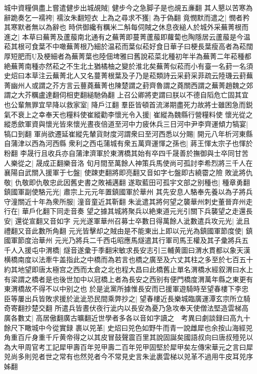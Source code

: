 城中資糧俱盡上嘗遣健步出城覘賊|{
	健步今之急脚子是也覘五亷翻}
其人懇以苦寒為辭跪奏乞一襦袴|{
	襦汝朱翻短衣}
上為之尋求不獲|{
	為于偽翻}
竟憫默而遣之|{
	憫者矜其寒默者無以為辭也}
時供御纔有糲米二斛每伺賊之休息夜縋人於城外采蕪菁根而進之|{
	本草曰蕪菁及蘆菔南北通有之蕪菁即蔓菁蘆菔即蘿蔔也陶隱居云蘆菔是今温菘其根可食葉不中噉蕪菁根乃細於温菘而葉似菘好食日華子曰梗長葉瘦高者為菘闊厚短肥而及梗細者為蕪菁葉也陸佃埤雅曰舊說菘菜北種初年半為蕪菁二年菘種都絶蕪菁南種亦然菘之不生北土猶橘柚之變於淮北矣蕪菁似菘而小有臺一名葑一名須史炤曰本草注云蕪菁北人又名蔓菁根葉及子乃是菘類詩云采葑采菲疏云陸璣云葑蕪菁幽州人或謂之芥方言云蘴蕘蕪菁也陳楚謂之葑齊魯謂之蕘關西謂之蕪菁趙魏之郊謂之大芥糲盧達翻伺相吏翻縋馳偽翻}
上召公卿將吏謂曰朕以不德自䧟危亡固其宜也公輩無罪宜早降以救家室|{
	降戶江翻}
羣臣皆頓首流涕期盡死力故將士雖困急而鋭氣不衰上之幸奉天也糧料使崔縱勸李懷光令入援|{
	崔縱為魏縣行營糧料使}
懷光從之縱悉歛軍資與懷光皆來懷光晝夜倍道至河中力疲休兵三日河中尹李齊運傾力犒宴|{
	犒口到翻}
軍尚欲遷延崔縱先輦貨財度河謂衆曰至河西悉以分賜|{
	開元八年析河東縣自蒲津以西為河西縣}
衆利之西屯蒲城有衆五萬齊運惲之孫也|{
	蔣王惲太宗子也惲於粉翻}
李晟行且收兵亦自蒲津濟軍於東渭橋其始有卒四千晟善於撫御與士卒同甘苦人樂從之|{
	晟成正翻樂音洛}
旬月間至萬餘人神策兵馬使尚可孤討李希烈將三千人在襄陽自武關入援軍于七盤|{
	使踈吏翻將即亮翻又音如字七盤即古繞霤之險}
敗泚將仇敬|{
	仇敬即仇敬忠此因舊史書之敗補邁翻}
遂取藍田可孤宇文部之别種也|{
	種章勇翻}
鎮國軍副使駱元光|{
	肅宗上元元年置鎮國軍於華州}
其先安息人駱奉先養以為子將兵守潼關近十年為衆所服|{
	潼音童近其靳翻}
朱泚遣其將何望之襲華州刺史董晉弃州走行在|{
	華戶化翻下同走音奏}
望之據其城將聚兵以絶東道元光引關下兵襲望之走還長安|{
	還從宣翻又音如字}
元光遂軍華州召募士卒數日得萬餘人泚數遣兵攻元光|{
	泚且禮翻又音此數所角翻}
元光皆擊却之賊由是不能東出上即以元光為鎮國軍節度使|{
	鎮國軍節度治華州}
元光乃將兵二千西屯昭應馬燧遣其行軍司馬王權及其子彚將兵五千人入援屯中渭橋|{
	燧音遂彚于季翻宋敏求長安志引三輔黄圖曰渭水貫都以象天漢横橋南度以法牽牛盖指此之中橋而為若言也橋之廣至及六丈其柱之多至於七百五十約其地望即唐太極宫之西而太倉之北也程大昌曰此橋舊止單名渭橋水經叙渭曰水上有梁謂之橋者是也後世加中以冠橋上者為長安之西别有便門橋度渭萬年縣之東更有東渭橋故不得不以中别之也}
於是泚黨所據惟長安而已援軍遊騎時至望春樓下李忠臣等屢出兵皆敗求援於泚泚恐民間乘弊抄之|{
	望春樓近長樂城臨廣運潭玄宗所立騎奇寄翻抄楚交翻}
所遣兵皆晝伏夜行泚内以長安為憂乃急攻奉天使僧法堅造雲梯高廣各數丈|{
	高居傲翻廣古曠翻近世學者多各以音如字讀之　考異曰劇談録曰高九十餘尺下瞰城中今從實録}
裹以兕革|{
	史炤曰兕色如野牛而青一說雌犀也余按山海經兕角重百斤身重千斤黄帝得之以其皮冒鼓聲震百里其說固誕矣國語叔向曰唐叔殪兕以為大甲周官考工記犀甲壽百年兕甲壽二百年兕甲固堅於犀甲矣左傳宋華元之言曰犀兕尚多則兕者世之常有也然兕者今不常見史言朱泚裹雲梯以兕革不過用牛皮耳兕序姊翻}
